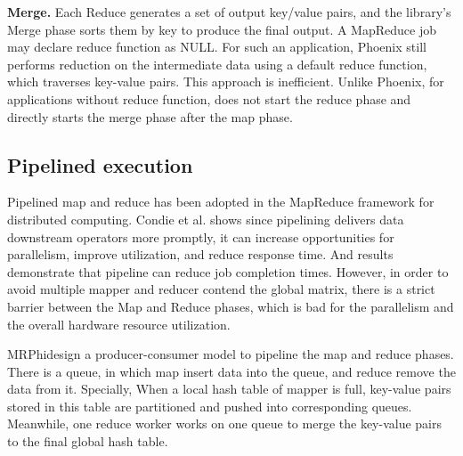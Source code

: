 {\bf Merge.}
Each Reduce generates a set of output key/value
pairs, and the library’s Merge phase sorts them by key to
produce the final output. 
A MapReduce job may declare reduce function as NULL. 
For such an application, 
Phoenix still performs reduction on the intermediate data using a default reduce function, 
which traverses key-value pairs. 
This approach is inefficient. 
Unlike Phoenix, for applications without reduce function, 
\myds does not start the reduce phase and directly starts the merge phase after the map phase.


\subsection{Pipelined execution}
Pipelined map and reduce has been adopted 
in the MapReduce framework for distributed computing\cite{Condie2010mapreduce}. 
Condie et al. shows since pipelining delivers data downstream operators
more promptly, it can increase opportunities for
parallelism, improve utilization, and reduce response
time.
And results demonstrate that pipeline can reduce job completion times.
However, in order to avoid multiple mapper and reducer contend the global matrix,
there is a strict barrier between the Map and Reduce phases,
which is bad for the parallelism and the overall hardware resource utilization.


MRPhi\cite{lu2013mrphi}design a producer-consumer model 
to pipeline the map and reduce phases.
There is a queue, in which map insert data into the queue, and reduce remove the data from it. 
Specially, When a local hash table of mapper is full,
key-value pairs stored in this table are partitioned and
pushed into corresponding queues. 
Meanwhile, one reduce worker works on one queue to merge the key-value pairs to
the final global hash table. 

